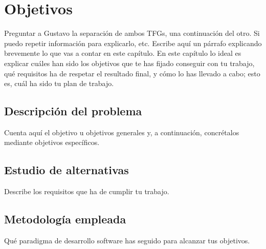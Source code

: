 \chapter{Objetivos}
\label{cap:capitulo2}

Preguntar a Gustavo la separación de ambos TFGs, una continuación del otro. Si puedo repetir información para explicarlo, etc. 
Escribe aquí un párrafo explicando brevemente lo que vas a contar en este capítulo. En este capítulo lo ideal es explicar cuáles han sido los objetivos que te has fijado conseguir con tu trabajo, qué requisitos ha de respetar el resultado final, y cómo lo has llevado a cabo; esto es, cuál ha sido tu plan de trabajo.\\

\section{Descripción del problema}
\label{sec:descripcion}

Cuenta aquí el objetivo u objetivos generales y, a continuación, concrétalos mediante objetivos específicos.

\section{Estudio de alternativas}
\label{sec:requisitos}

Describe los requisitos que ha de cumplir tu trabajo.

\section{Metodología empleada}
\label{sec:metodologia}

Qué paradigma de desarrollo software has seguido para alcanzar tus objetivos.
